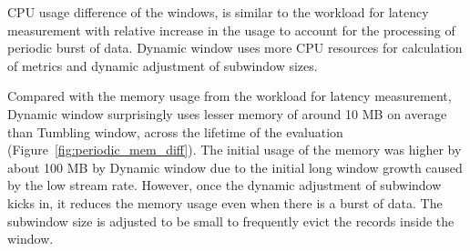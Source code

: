 CPU usage difference of the windows, is similar to the workload for latency measurement with relative increase 
in the usage to account for the processing of periodic burst of data. Dynamic window uses more CPU resources for 
calculation of metrics and dynamic adjustment of subwindow sizes. 

Compared with the memory usage from the workload for latency measurement, Dynamic window surprisingly uses 
lesser memory of around 10 MB on average than Tumbling window, across the lifetime of the evaluation (Figure~\ref{fig:periodic_mem_diff}). 
The initial usage of the memory was higher by about 100 MB by Dynamic window due to the initial long window growth 
caused by the low stream rate. However, once 
the dynamic adjustment of subwindow kicks in, it reduces the memory usage even when there is a burst of data. The subwindow size
is adjusted to be small to frequently evict the records inside the window. 

